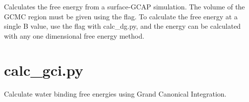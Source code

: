 \documentclass[letterpaper,10pt,english]{sphinxmanual}
\begin{document}

%
\begin{sphinxVerbatim}[commandchars=\\\{\}]
    
     
      
\end{sphinxVerbatim}


Calculates the free energy from a surface-GCAP simulation. The volume of the GCMC region must be given using the  flag. To calculate the free energy at a single B value, use the  flag with calc\_dg.py, and the energy can be calculated with any one dimensional free energy method.


\section{calc\_gci.py}
\label{\detokenize{tools:calc-gci-py}}

Calculate water binding free energies using Grand Canonical Integration.
\end{document}
